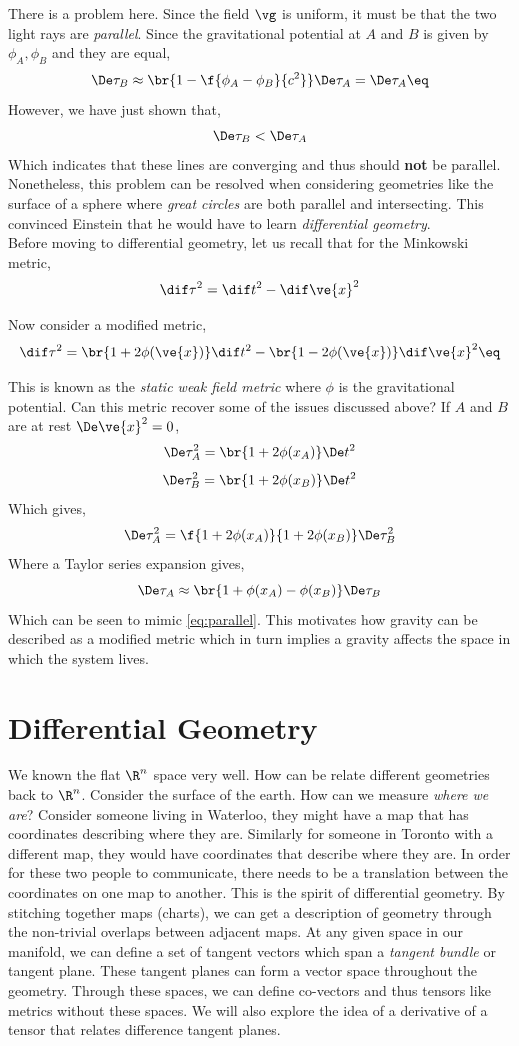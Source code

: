 \documentclass{article}
\begin{document}
There is a problem here. Since the field $\vg$ is uniform, it must be that the two light rays are \textit{parallel}. Since the gravitational potential at $A$ and $B$ is given by $\phi_A, \phi_B$ and they are equal,
\[ \De \tau_B \approx \br{1 - \f{\phi_A - \phi_B}{c^2}} \De \tau_A = \De \tau_A \eq \label{eq:parallel} \]
However, we have just shown that,
\[ \De \tau_B < \De \tau_A \]
Which indicates that these lines are converging and thus should \textbf{not} be parallel. Nonetheless, this problem can be resolved when considering geometries like the surface of a sphere where \textit{great circles} are both parallel and intersecting. This convinced Einstein that he would have to learn \textit{differential geometry}. \\

Before moving to differential geometry, let us recall that for the Minkowski metric,
\[ \dif \tau^2 = \dif t^2 - \dif \ve{x}^2 \]

Now consider a modified metric,
\[ \dif \tau^2 = \br{1+2\phi(\ve{x})}\dif t^2 - \br{1-2\phi(\ve{x})}\dif \ve{x}^2 \eq \label{eq:modmetric}\]

This is known as the \textit{static weak field metric} where $\phi$ is the gravitational potential. Can this metric recover some of the issues discussed above? If $A$ and $B$ are at rest $\De \ve{x}^2 = 0$,
\[ \De \tau_A^2 = \br{1+2\phi(x_A)}\De t^2 \]
\[ \De \tau_B^2 = \br{1+2\phi(x_B)}\De t^2 \]
Which gives,
\[ \De \tau_A^2 = \f{1+2\phi(x_A)}{1+2\phi(x_B)}\De \tau_B^2 \]
Where a Taylor series expansion gives,
\[ \De \tau_A \approx \br{1+\phi(x_A)-\phi(x_B)}\De \tau_B \]
Which can be seen to mimic \eqref{eq:parallel}. This motivates how gravity can be described as a modified metric which in turn implies a gravity affects the space in which the system lives.

\section{Differential Geometry}

We known the flat $\R^n$ space very well. How can be relate different geometries back to $\R^n$. Consider the surface of the earth. How can we measure \textit{where we are}? Consider someone living in Waterloo, they might have a map that has coordinates describing where they are. Similarly for someone in Toronto with a different map, they would have coordinates that describe where they are. In order for these two people to communicate, there needs to be a translation between the coordinates on one map to another. This is the spirit of differential geometry. By stitching together maps (charts), we can get a description of geometry through the non-trivial overlaps between adjacent maps. At any given space in our manifold, we can define a set of tangent vectors which span a \textit{tangent bundle} or tangent plane. These tangent planes can form a vector space throughout the geometry. Through these spaces, we can define co-vectors and thus tensors like metrics without these spaces. We will also explore the idea of a derivative of a tensor that relates difference tangent planes.
\end{document}
